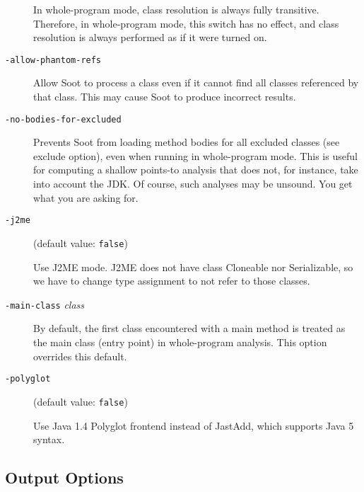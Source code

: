 \documentclass{article}
\begin{document}
\begin{description}
In whole-program mode, class resolution is always fully transitive. Therefore,
in whole-program mode, this switch has no effect, and class resolution is
always performed as if it were turned on.



  \item[
  {\tt -allow-phantom-refs}]

Allow Soot to process a class even if it cannot find all classes
referenced by that class. This may cause Soot to produce
incorrect results.



  \item[
  {\tt -no-bodies-for-excluded}]

Prevents Soot from loading method bodies for all excluded classes (see exclude option), even
when running in whole-program mode. This is useful for computing a shallow points-to analysis
that does not, for instance, take into account the JDK. Of course, such analyses may be unsound.
You get what you are asking for.



  \item[
  {\tt -j2me}]

(default value: {\tt false})

Use J2ME mode. J2ME does not have class Cloneable nor Serializable, so we have
to change type assignment to not refer to those classes.			



  \item[
  {\tt -main-class}{ \it class}]


\par

By default, the first class encountered with a main method is treated
as the main class (entry point) in whole-program analysis. This option
overrides this default.




  \item[
  {\tt -polyglot}]

(default value: {\tt false})

Use Java 1.4 Polyglot frontend instead of JastAdd, which supports Java 5 syntax.



\end{description}


\subsection{Output Options}
\end{document}
